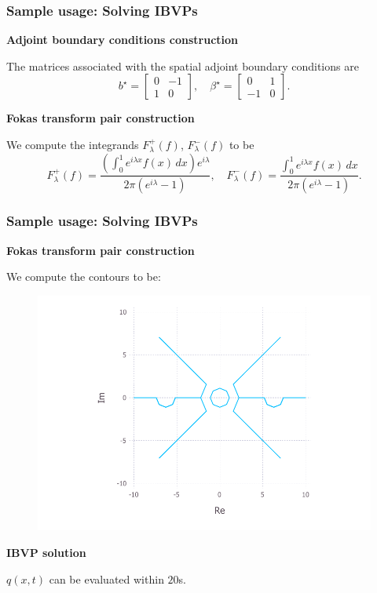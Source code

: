 \documentclass{beamer}
\begin{document}
\begin{frame}
    \frametitle{Sample usage: Solving IBVPs}
    \textbf{Adjoint boundary conditions construction}

    The matrices associated with the spatial adjoint boundary conditions are
    \[b^\star = \begin{bmatrix}0&-1\\ 1&0\end{bmatrix},\quad \beta^\star = \begin{bmatrix}0&1\\ -1&0\end{bmatrix}.\]

    \textbf{Fokas transform pair construction}

    We compute the integrands $F_\lambda^+(f)$, $F_\lambda^-(f)$ to be
    \[F_\lambda^+(f) = \frac{\left(\int_0^1 e^{i\lambda x}f(x)\,dx\right)e^{i\lambda}}{2\pi(e^{i\lambda}-1)},\quad F_\lambda^-(f) = \frac{\int_0^1 e^{i\lambda x}f(x)\,dx}{2\pi(e^{i\lambda}-1)}.\]
\end{frame}

\begin{frame}
    \frametitle{Sample usage: Solving IBVPs}
    \textbf{Fokas transform pair construction}

    We compute the contours to be:
    \begin{figure}[htpb!]
        \centering
        \includegraphics[width=0.7\linewidth]{ex1_contourPlot.pdf}
    \end{figure}
    \textbf{IBVP solution}

    $q(x,t)$ can be evaluated within $20$s.
\end{frame}
\end{document}

